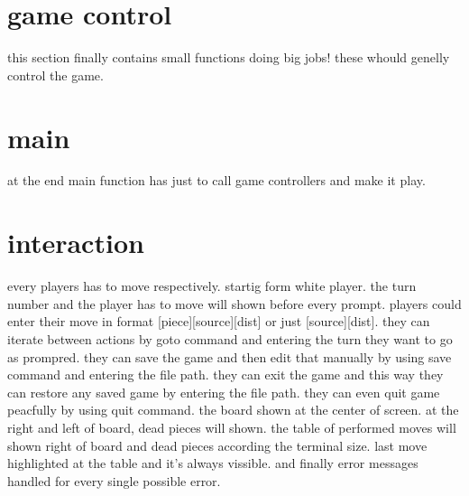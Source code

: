\documentclass[11pt]{article} %
\begin{document}
\section{game control}
this section finally contains small functions doing big jobs! these whould genelly control the game.

\section{main}
at the end main function has just to call game controllers and make it play.


\section{interaction}
every players has to move respectively. startig form white player. the turn number and the player has to move will shown before every prompt. players could enter their move in format [piece][source][dist] or just [source][dist]. they can iterate between actions by goto command and entering the turn they want to go as prompred. they can save the game and then edit that manually by using save command and entering the file path.
they can exit the game and this way they can restore any saved game by entering the file path.
they can even quit game peacfully by using quit command.
the board shown at the center of screen. at the right and left of board, dead pieces will shown. the table of performed moves will shown right of board and dead pieces according the terminal size. last move highlighted at the table and it's always vissible.
and finally error messages handled for every single possible error.
\end{document}
